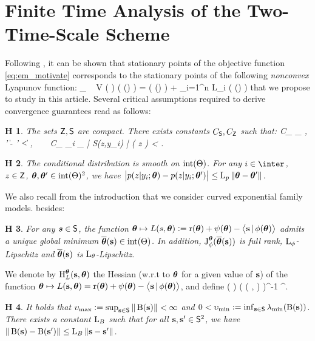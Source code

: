 \documentclass[11pt]{article}
\makeatletter
\newtheorem{assumption}{H\!\!}
\theoremstyle{t}
\DeclareRobustCommand*\cal{\@fontswitch\relax\mathcal}
\makeatother
\begin{document}
\section{Finite Time Analysis of the Two-Time-Scale Scheme} \label{sec:mainanalysis}
Following \citep{cappe2009line}, it can be shown that stationary points of the objective function \eqref{eq:em_motivate} corresponds to the stationary points of the following \textit{nonconvex} Lyapunov function:
\beq\label{eq:em_sspace}
\min_{ {\bss} \in \Sset }~  V ( {\bss} ) \eqdef \overline\calL( \op(\bss) ) = \Pen (  \op(\bss) ) +  \sum_{i=1}^n {\cal L}_i (  \op(\bss) )
\eeq
that we propose to study in this article.
Several critical assumptions required to derive convergence guarantees read as follows:
\begin{assumption}\label{ass:compact}
The sets $\mathsf{Z}, \mathsf{S}$ are compact. There exists constants $C_{\mathsf{S}}, C_{\mathsf{Z}}$ such that:
\beq \textstyle \label{eq:compact}
C_{\Sset} \eqdef \max_{ \bss, \bss' \in \Sset } \| \bss - \bss' \| < \infty,~~~~C_{\Zset} \eqdef \max_{i \in \inter} \int_{\Zset} | S(z,y_i) | \mu( \rmd z ) < \infty.
\eeq
\end{assumption}

\begin{assumption}\label{ass:expected}
The conditional distribution is smooth on ${\rm int}(\Theta)$. For any $i \in \inter$, $z \in \mathsf{Z}$, ${\bm{\theta}}, {\bm{\theta}}' \in {\rm int} (\Theta)^2$, we have
$\big| p( z | y_i; {\bm{\theta}} ) - p( z | y_i; {\bm{\theta}}' ) \big| \leq  \operatorname{L}_{p} \| {\bm{\theta}} - {\bm{\theta}}' \|$.
\end{assumption}

We also recall from the introduction that we consider curved exponential family models. besides:
\begin{assumption} \label{ass:reg}
For any $\bm{s} \in \mathsf{S}$, the function ${\bm{\theta}} \mapsto L(s,{\bm{\theta}}) \mathrel{\mathop:}= \operatorname{r}( {\bm{\theta}} ) + \psi( {\bm{\theta}}) - \big\langle {\mathbf{s}}\,|\, \phi ( {\bm{\theta}})  \big\rangle$ admits a unique global minimum $\overline{{\bm{\theta}}}({{\mathbf{s}}}) \in {\rm int}(\Theta)$.
In addition, $\operatorname{J}_{\phi}^{{\bm{\theta}}}(\overline{{\bm{\theta}}}({\mathbf{s}} ))$ is full rank, $\operatorname{L}_{\phi}$-Lipschitz and $\overline{{\bm{\theta}}}( {\mathbf{s}} )$ is $\operatorname{L}_{\theta}$-Lipschitz.
\end{assumption}
We denote by $\operatorname{H}_{L}^{{\bm{\theta}}}({\mathbf{s}},{\bm{\theta}})$ the Hessian (w.r.t to ${\bm{\theta}}$ for a given value of ${\mathbf{s}}$) of the function ${\bm{\theta}} \mapsto L({\mathbf{s}},{\bm{\theta}})= \operatorname{r}({\bm{\theta}}) + \psi({\bm{\theta}}) -\big\langle{\mathbf{s}}\,|\,\phi({\bm{\theta}}) \big\rangle$, and define
\beq\label{eq:Bss}
( \bss ) \eqdef\jacob{ \phi }{ \param }{ \mstep{\bss} } \Big( ( {\bss},  \mstep{\bss} )  \Big)^{-1} \jacob{ \phi }{ \param }{ \mstep{\bss} }^\top.
\eeq
\begin{assumption}\label{ass:eigen}
It holds that $ \upsilon_{\max} \mathrel{\mathop:}= \sup_{{\mathbf{s}} \in \mathsf{S}} \| \operatorname{B}( {\mathbf{s}} ) \| < \infty$ and $0 < \upsilon_{\min}  \mathrel{\mathop:}= \inf_{{\mathbf{s}} \in \mathsf{S}} \lambda_{\rm min} ( \operatorname{B}( {\mathbf{s}} ) )$.
There exists a constant $\operatorname{L}_{B}$ such that for all ${\mathbf{s}}, {\mathbf{s}}' \in \mathsf{S}^2$, we have $ \| \operatorname{B}( {\mathbf{s}} ) - \operatorname{B}( {\mathbf{s}}' )  \| \leq \operatorname{L}_{B} \| {{\mathbf{s}}} - {{\mathbf{s}}}' \|$.
\end{assumption}
\end{document}
